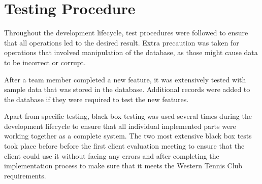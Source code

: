 \documentclass{l3proj}
\begin{document}
\section{Testing Procedure}
Throughout the development lifecycle, test procedures were followed to ensure that all operations led to the desired result. Extra precaution was taken for operations that involved manipulation of the database, as those might cause data to be incorrect or corrupt.\\
\par
After a team member completed a new feature, it was extensively tested with sample data that was stored in the database. Additional records were added to the database if they were required to test the new features.\\
\par Apart from specific testing, black box testing was used several times during the development lifecycle to ensure that all individual implemented parts were working together as a complete system. The two most extensive black box tests took place before before the first client evaluation meeting to ensure that the client could use it without facing any errors and after completing the implementation process to make sure that it meets the Western Tennis Club requirements.

\end{document}
